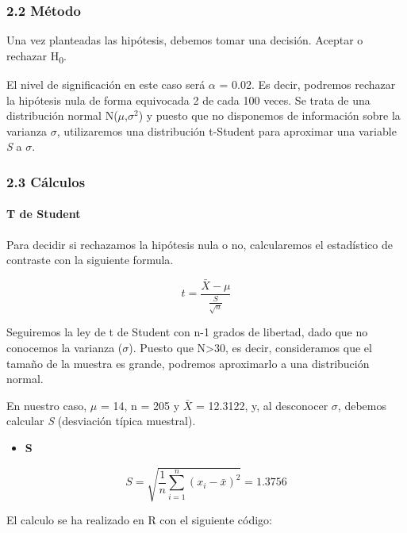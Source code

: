 \documentclass[
]{article}
\providecommand{\tightlist}{%
  \setlength{\itemsep}{0pt}\setlength{\parskip}{0pt}}
\begin{document}
\hypertarget{muxe9todo}{%
\subsubsection{2.2 Método}\label{muxe9todo}}

Una vez planteadas las hipótesis, debemos tomar una decisión. Aceptar o
rechazar H\textsubscript{0}.

El nivel de significación en este caso será \(\alpha\) = 0.02. Es decir,
podremos rechazar la hipótesis nula de forma equivocada 2 de cada 100
veces. Se trata de una distribución normal N(\(\mu\),\(\sigma^2\)) y
puesto que no disponemos de información sobre la varianza \(\sigma\),
utilizaremos una distribución t-Student para aproximar una variable
\emph{S} a \(\sigma\).

\hypertarget{cuxe1lculos}{%
\subsubsection{2.3 Cálculos}\label{cuxe1lculos}}

\hypertarget{t-de-student}{%
\paragraph{T de Student}\label{t-de-student}}

Para decidir si rechazamos la hipótesis nula o no, calcularemos el
estadístico de contraste con la siguiente formula.

\[t = \frac{\bar{X} - \mu}{\frac{S}{\sqrt{n}}}\]

Seguiremos la ley de t de Student con n-1 grados de libertad, dado que
no conocemos la varianza (\(\sigma\)). Puesto que N\textgreater30, es
decir, consideramos que el tamaño de la muestra es grande, podremos
aproximarlo a una distribución normal.

En nuestro caso, \(\mu\) = 14, n = 205 y \(\bar{X}\) = 12.3122, y, al
desconocer \(\sigma\), debemos calcular \emph{S} (desviación típica
muestral).

\begin{itemize}
\tightlist
\item
  \textbf{S}
\end{itemize}

\[S = \sqrt{\frac{1}{n}\sum_{i = 1}^{n}(x_i - \bar{x})^2} = 1.3756\]

El calculo se ha realizado en R con el siguiente código:
\end{document}
